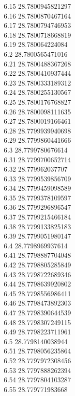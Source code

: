 {6.15	28.7800945821297\\
6.16	28.7800870467164\\
6.17	28.7800794746953\\
6.18	28.7800718668819\\
6.19	28.780064224084\\
6.2	28.7800565471016\\
6.21	28.7800488367268\\
6.22	28.7800410937444\\
6.23	28.7800333189312\\
6.24	28.7800255130567\\
6.25	28.7800176768827\\
6.26	28.7800098111635\\
6.27	28.7800019166461\\
6.28	28.7799939940698\\
6.29	28.7799860441666\\
6.3	28.7799780676614\\
6.31	28.7799700652714\\
6.32	28.779962037707\\
6.33	28.7799539856709\\
6.34	28.7799459098589\\
6.35	28.7799378109597\\
6.36	28.7799296896547\\
6.37	28.7799215466184\\
6.38	28.7799133825183\\
6.39	28.7799051980147\\
6.4	28.7798969937614\\
6.41	28.7798887704048\\
6.42	28.7798805285849\\
6.43	28.7798722689346\\
6.44	28.7798639920802\\
6.45	28.7798556986411\\
6.46	28.7798473892303\\
6.47	28.7798390644539\\
6.48	28.7798307249115\\
6.49	28.7798223711961\\
6.5	28.7798140038944\\
6.51	28.7798056235864\\
6.52	28.7797972308456\\
6.53	28.7797888262394\\
6.54	28.7797804103287\\
6.55	28.779771983668\\
}
